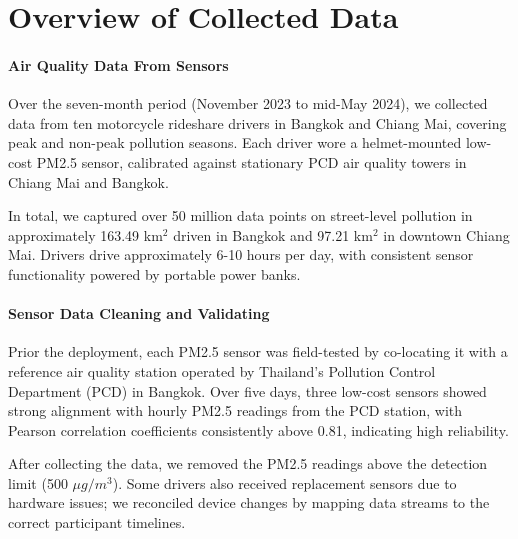 \section{Overview of Collected Data}
\label{sec:result-overview-data}

\paragraph{Air Quality Data From Sensors}
Over the seven-month period (November 2023 to mid-May 2024), we collected data from ten motorcycle rideshare drivers in Bangkok and Chiang Mai, covering peak and non-peak pollution seasons.
Each driver wore a helmet-mounted low-cost PM2.5 sensor, calibrated against stationary PCD air quality towers in Chiang Mai and Bangkok.

In total, we captured over 50 million data points on street-level pollution in approximately 163.49 km$^2$ driven in Bangkok and 97.21 km$^2$ in downtown Chiang Mai.
Drivers drive approximately 6-10 hours per day, with consistent sensor functionality powered by portable power banks.

\paragraph{Sensor Data Cleaning and Validating}
Prior the deployment, each PM2.5 sensor was field-tested by co-locating it with a reference air quality station operated by Thailand’s Pollution Control Department (PCD) in Bangkok.
Over five days, three low-cost sensors showed strong alignment with hourly PM2.5 readings from the PCD station, with Pearson correlation coefficients consistently above 0.81, indicating high reliability. 

After collecting the data, we removed the PM2.5 readings above the detection limit (500 $\mu g/m^3$). 
Some drivers also received replacement sensors due to hardware issues; we reconciled device changes by mapping data streams to the correct participant timelines. 


